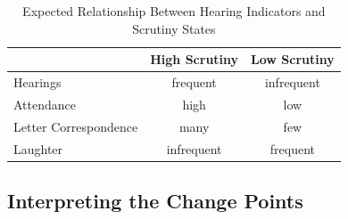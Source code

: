 \documentclass[a4paper]{article}\usepackage[]{graphicx}\usepackage[]{color}
\begin{document}
\begin{table}
    \caption{Expected Relationship Between Hearing Indicators and Scrutiny States}
    \label{ExpectedTable}
    \begin{center}
        \begin{tabular}{l | c c}
            \hline
            & High Scrutiny & Low Scrutiny \\
            \hline \hline
            Hearings & frequent & infrequent \\[0.25cm]
            Attendance & high & low \\[0.25cm]
            Letter Correspondence & many & few \\[0.25cm]
            Laughter & infrequent & frequent \\
            \hline
        \end{tabular}
    \end{center}
\end{table}

\subsection{Interpreting the Change Points}
\end{document}
